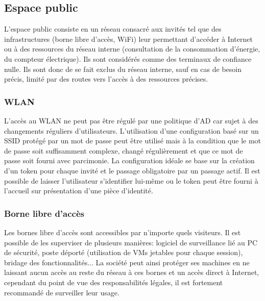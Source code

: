 \documentclass[twoside,a4paper,12pt,titlepage]{book}
\begin{document}
\subsection{Espace public}
	L'espace public consiste en un réseau consacré aux invités tel que des infrastructures (borne libre d'accès, \gls{WiFi}) leur permettant d'accéder à Internet ou à des ressources du réseau interne (consultation de la consommation d'énergie, du compteur électrique). Ils sont considérés comme des terminaux de confiance nulle. Ils sont donc de se fait exclus du réseau interne, sauf en cas de besoin précis, limité par des routes vers l'accès à des ressources précises.
	\subsubsection{WLAN}
	L'accès au \gls{WLAN} ne peut pas être régulé par une politique d'AD car sujet à des changements réguliers d'utilisateurs. L'utilisation d'une configuration basé sur un SSID protégé par un mot de passe peut être utilisé mais à la condition que le mot de passe soit suffisamment complexe, changé régulièrement et que ce mot de passe soit fourni avec parcimonie. La configuration idéale se base sur la création d'un token pour chaque invité et le passage obligatoire par un passage actif. Il est possible de laisser l'utilisateur s'identifier lui-même ou le token peut être fourni à l'accueil sur présentation d'une pièce d'identité.
	\subsubsection{Borne libre d'accès}
	Les bornes libre d'accès sont accessibles par n'importe quels visiteurs. Il est possible de les superviser de plusieurs manières: logiciel de surveillance lié au PC de sécurité, poste déporté (utilisation de VMs jetables pour chaque session), bridage des fonctionnalités... La société peut ainsi protéger ses machines en ne laissant aucun accès au reste du réseau à ces bornes et un accès direct à Internet, cependant du point de vue des responsabilités légales, il est fortement recommandé de surveiller leur usage.
\end{document}

